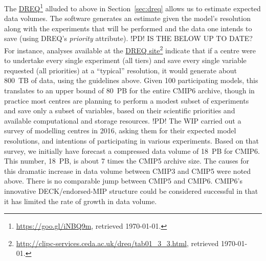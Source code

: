 \documentclass[gmd,manuscript]{copernicus}
\newcommand{\urlref}[2] {\href{#1}{#2}\footnote{\url{#1}, retrieved \today.}}
\begin{document}
The \urlref{https://goo.gl/iNBQ9m}{DREQ} alluded to above in
Section~\ref{sec:dreq} allows us to estimate expected data volumes.  
The software generates an estimate given the model's
resolution along with the experiments that will be performed and the
data one intends to save (using DREQ's \emph{priority} attribute).
!PD! IS THE BELOW UP TO DATE?
For instance,
analyses available at the
\urlref{http://clipc-services.ceda.ac.uk/dreq/tab01_3_3.html}{DREQ
site} indicate that if a centre were to undertake every single
experiment (all tiers) and save every single variable requested (all
priorities) at a ``typical'' resolution, it would generate about
800~TB of data, using the guidelines above. Given 100 participating
models, this translates to an upper bound of 80~PB for the entire
CMIP6 archive, though in practice most centres are planning to perform
a modest subset of experiments and save only a subset of variables, based on
their scientific priorities and available computational and storage
resources.
!PD!
The WIP carried out a survey of modelling centres in 2016,
asking them for their expected model resolutions, and intentions of
participating in various experiments. Based on that survey, we
initially have forecast a
compressed data volume of 18~PB for CMIP6. This number, 18~PB, is
about 7 times the CMIP5
archive size.
The causes for this dramatic increase in data volume between CMIP3 and CMIP5
were noted above. There is no comparable jump between CMIP5 and CMIP6.
CMIP6's innovative DECK/endorsed-MIP structure could be considered 
successful in that it has limited the rate of growth in data volume.  
\end{document}
